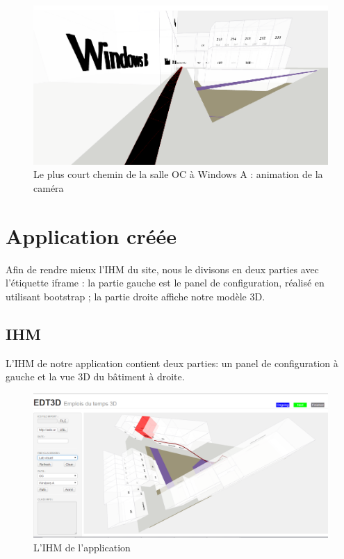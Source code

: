 \documentclass[twoside]{EPURapport}
\begin{document}
\begin{figure}[!htbp]
	\centering
		\includegraphics[scale=0.5]{img/oc_wina_anim.png}
	\caption{Le plus court chemin de la salle OC à Windows A : animation de la caméra}
	\label{fig:oc_wina_anim}
\end{figure}
\bigskip


\section{Application créée} %
Afin de rendre mieux l'IHM du site, nous le divisons en deux parties avec l'étiquette iframe : la partie gauche est le panel de configuration, réalisé en utilisant bootstrap ; la partie droite affiche notre modèle 3D.



\subsection{IHM}
L'IHM de notre application contient deux parties: un panel de configuration à gauche et la vue 3D du bâtiment à droite.

\begin{figure}[!htbp]
	\centering
		\includegraphics[scale=0.5]{img/ihm.png}
	\caption{L'IHM de l'application}
	\label{fig:ihm}
\end{figure}
\bigskip
\end{document}
